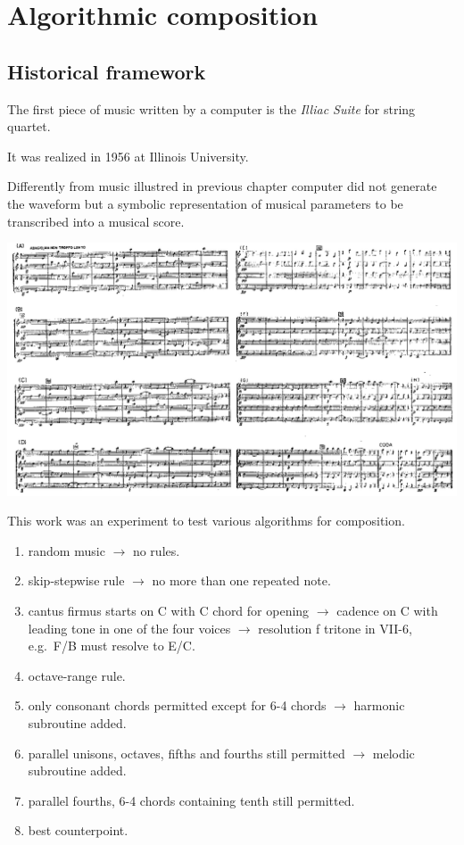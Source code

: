 \chapter{Algorithmic  composition}

\section{Historical framework}\label{historical-framework}

The first piece of music written by a computer is the \textit{Illiac Suite} for string quartet.

It was realized in 1956 at Illinois University.

Differently from music illustred in previous chapter computer did not generate the waveform but a symbolic representation of musical parameters to be transcribed into a musical score.

\begin{center}
\includegraphics[scale=1]{../img/illiac.png}
\end{center}

This work was an experiment to test various algorithms for composition.

\begin{enumerate}
\def\labelenumi{\arabic{enumi}.}
\tightlist
\item random music \(\rightarrow\) no rules.
\item skip-stepwise rule \(\rightarrow\) no more than one repeated note.
\item cantus firmus starts on C with C chord for opening \(\rightarrow\) cadence on C with leading tone in one of the four voices \(\rightarrow\) resolution f tritone in VII-6, e.g.~F/B must resolve to E/C.
\item octave-range rule.
\item only consonant chords permitted except for 6-4 chords \(\rightarrow\) harmonic subroutine added.
\item parallel unisons, octaves, fifths and fourths still permitted \(\rightarrow\) melodic subroutine added.
\item parallel fourths, 6-4 chords containing tenth still permitted.
\item best counterpoint.
\end{enumerate}

